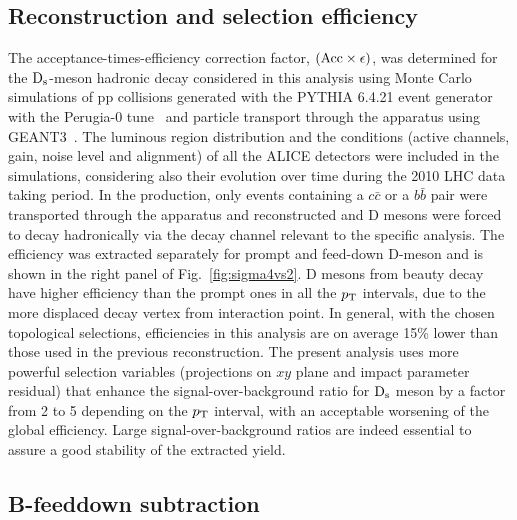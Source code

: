 \subsection{Reconstruction and selection efficiency}
The acceptance-times-efficiency correction factor, 
$(\rm Acc \times \epsilon)$, was determined for the ${\rm D_s}$-meson
hadronic decay considered in this analysis using Monte Carlo simulations 
of pp collisions generated with the PYTHIA 6.4.21 event generator~\cite{Sjostrand:2006za} with the 
Perugia-0 tune~\cite{Skands:2010ak} and particle transport through the apparatus 
using GEANT3~\cite{Brun:1994aa}.
The luminous region distribution and the conditions (active channels, gain, 
noise level and alignment) of all the ALICE detectors were included in the 
simulations, considering also their evolution over time during the 2010 LHC 
data taking period.
In the production, only events containing a $c\bar{c}$ or a $b\bar{b}$ pair 
were transported through the apparatus and reconstructed and
D mesons were forced to decay hadronically via the decay channel relevant to
the specific analysis.
The efficiency was extracted separately for prompt and feed-down D-meson and 
is shown in the right panel of Fig.~\ref{fig:sigma4vs2}.
D mesons from beauty decay have higher efficiency than
the prompt ones in all the $p_{\rm T}$ intervals, due to the more displaced 
decay vertex from interaction point.
In general, with the chosen topological selections, efficiencies in this analysis
are on average 15\% lower than those used in the previous reconstruction. 
The present analysis uses more powerful selection variables 
(projections on $xy$ plane and impact parameter residual) that
enhance the signal-over-background ratio for ${\rm D_s}$ meson by a factor 
from 2 to 5 depending on the $p_{\rm T}$ interval, with an acceptable worsening
of the global efficiency. Large signal-over-background ratios are indeed essential 
to assure a good stability of the extracted yield.

\subsection{B-feeddown subtraction}

